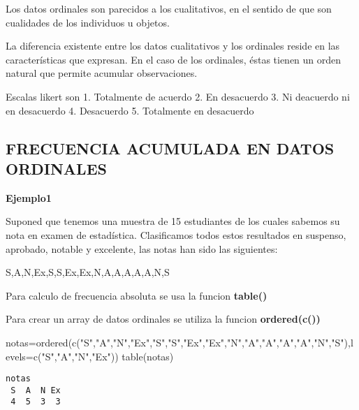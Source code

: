 \documentclass[
]{article}
\newenvironment{Shaded}{\begin{snugshade}}{\end{snugshade}}
\newcommand{\AttributeTok}[1]{\textcolor[rgb]{0.77,0.63,0.00}{#1}}
\newcommand{\FunctionTok}[1]{\textcolor[rgb]{0.00,0.00,0.00}{#1}}
\newcommand{\NormalTok}[1]{#1}
\newcommand{\OtherTok}[1]{\textcolor[rgb]{0.56,0.35,0.01}{#1}}
\newcommand{\StringTok}[1]{\textcolor[rgb]{0.31,0.60,0.02}{#1}}
\begin{document}
Los datos ordinales son parecidos a los cualitativos, en el sentido de
que son cualidades de los individuos u objetos.

La diferencia existente entre los datos cualitativos y los ordinales
reside en las características que expresan. En el caso de los ordinales,
éstas tienen un orden natural que permite acumular observaciones.

Escalas likert son 1. Totalmente de acuerdo 2. En desacuerdo 3. Ni
deacuerdo ni en desacuerdo 4. Desacuerdo 5. Totalmente en desacuerdo

\hypertarget{frecuencia-acumulada-en-datos-ordinales}{%
\subsection{FRECUENCIA ACUMULADA EN DATOS
ORDINALES}\label{frecuencia-acumulada-en-datos-ordinales}}

\textbf{Ejemplo1}

Suponed que tenemos una muestra de 15 estudiantes de los cuales sabemos
su nota en examen de estadística. Clasificamos todos estos resultados en
suspenso, aprobado, notable y excelente, las notas han sido las
siguientes:

S,A,N,Ex,S,S,Ex,Ex,N,A,A,A,A,A,N,S

Para calculo de frecuencia absoluta se usa la funcion \textbf{table()}

Para crear un array de datos ordinales se utiliza la funcion
\textbf{ordered(c())}

\begin{Shaded}
\begin{Highlighting}[]
\NormalTok{notas}\OtherTok{=}\FunctionTok{ordered}\NormalTok{(}\FunctionTok{c}\NormalTok{(}\StringTok{"S"}\NormalTok{,}\StringTok{"A"}\NormalTok{,}\StringTok{"N"}\NormalTok{,}\StringTok{"Ex"}\NormalTok{,}\StringTok{"S"}\NormalTok{,}\StringTok{"S"}\NormalTok{,}\StringTok{"Ex"}\NormalTok{,}\StringTok{"Ex"}\NormalTok{,}\StringTok{"N"}\NormalTok{,}\StringTok{"A"}\NormalTok{,}\StringTok{"A"}\NormalTok{,}\StringTok{"A"}\NormalTok{,}\StringTok{"A"}\NormalTok{,}\StringTok{"N"}\NormalTok{,}\StringTok{"S"}\NormalTok{),}\AttributeTok{levels=}\FunctionTok{c}\NormalTok{(}\StringTok{"S"}\NormalTok{,}\StringTok{"A"}\NormalTok{,}\StringTok{"N"}\NormalTok{,}\StringTok{"Ex"}\NormalTok{))}
\FunctionTok{table}\NormalTok{(notas)}
\end{Highlighting}
\end{Shaded}

\begin{verbatim}
notas
 S  A  N Ex 
 4  5  3  3 
\end{verbatim}
\end{document}
